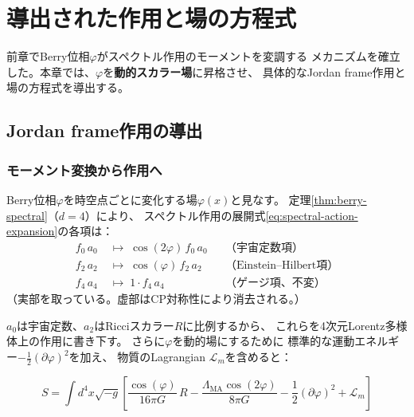 
\chapter{導出された作用と場の方程式}
\label{ch:action-field-eqs}

前章でBerry位相$\varphi$がスペクトル作用のモーメントを変調する
メカニズムを確立した。本章では、$\varphi$を\textbf{動的スカラー場}に昇格させ、
具体的なJordan frame作用と場の方程式を導出する。

\section{Jordan frame作用の導出}
\label{sec:8.1}

\subsection{モーメント変換から作用へ}

Berry位相$\varphi$を時空点ごとに変化する場$\varphi(x)$と見なす。
定理\ref{thm:berry-spectral}（$d=4$）により、
スペクトル作用の展開式\eqref{eq:spectral-action-expansion}の各項は：
\begin{align}
f_0 \, a_0 &\;\longmapsto\; \cos(2\varphi)\, f_0 \, a_0
  & &\text{（宇宙定数項）} \\
f_2 \, a_2 &\;\longmapsto\; \cos(\varphi)\, f_2 \, a_2
  & &\text{（Einstein--Hilbert項）} \\
f_4 \, a_4 &\;\longmapsto\; 1 \cdot f_4 \, a_4
  & &\text{（ゲージ項、不変）}
\end{align}
（実部を取っている。虚部はCP対称性により消去される。）

$a_0$は宇宙定数、$a_2$はRicciスカラー$R$に比例するから、
これらを4次元Lorentz多様体上の作用に書き下す。
さらに$\varphi$を動的場にするために
標準的な運動エネルギー$-\frac{1}{2}(\partial\varphi)^2$を加え、
物質のLagrangian $\mathcal{L}_m$を含めると：

\begin{keyresult}
\begin{equation}
\boxed{
S = \int d^4x \sqrt{-g}\left[
  \frac{\cos(\varphi)}{16\pi G}\,R
  - \frac{\Lambda_{\mathrm{MA}}\cos(2\varphi)}{8\pi G}
  - \frac{1}{2}(\partial\varphi)^2
  + \mathcal{L}_m
\right]
}
\label{eq:jordan-frame-action}
\end{equation}
\end{keyresult}

